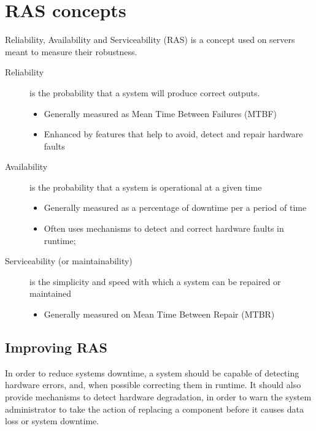 \documentclass[a4paper,8pt,english]{sphinxmanual}
\begin{document}
\section{RAS concepts}
\label{admin-guide/ras:ras-concepts}
Reliability, Availability and Serviceability (RAS) is a concept used on
servers meant to measure their robustness.
\begin{description}
\item[{Reliability}] \leavevmode
is the probability that a system will produce correct outputs.
\begin{itemize}
\item {} 
Generally measured as Mean Time Between Failures (MTBF)

\item {} 
Enhanced by features that help to avoid, detect and repair hardware faults

\end{itemize}

\item[{Availability}] \leavevmode
is the probability that a system is operational at a given time
\begin{itemize}
\item {} 
Generally measured as a percentage of downtime per a period of time

\item {} 
Often uses mechanisms to detect and correct hardware faults in
runtime;

\end{itemize}

\item[{Serviceability (or maintainability)}] \leavevmode
is the simplicity and speed with which a system can be repaired or
maintained
\begin{itemize}
\item {} 
Generally measured on Mean Time Between Repair (MTBR)

\end{itemize}

\end{description}


\subsection{Improving RAS}
\label{admin-guide/ras:improving-ras}
In order to reduce systems downtime, a system should be capable of detecting
hardware errors, and, when possible correcting them in runtime. It should
also provide mechanisms to detect hardware degradation, in order to warn
the system administrator to take the action of replacing a component before
it causes data loss or system downtime.
\end{document}
